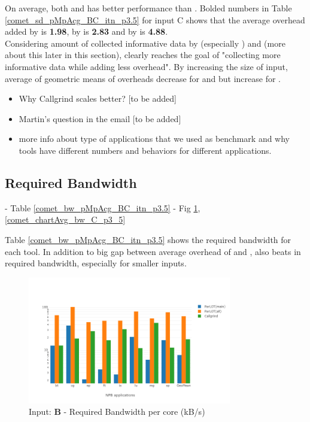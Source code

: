  
 
On average, both \parlotm and \parlota has better performance than \callgrind. Bolded numbers in Table \ref{comet_sd_pMpAcg_BC_itn_p3.5} for input C shows that the average overhead added by \parlotm is \textbf{1.98}, by \parlota is \textbf{2.83} and by \callgrind is \textbf{4.88}. 
\\
Considering amount of collected informative data by \parlot (especially \parlota) and \callgrind (more about this later in this section), clearly \parlot reaches the goal of "collecting more informative data while adding less overhead".
By increasing the size of input, average of geometric means of overheads decrease for \parlotm and \parlota but increase for \callgrind. 

\begin{itemize}
\item Why Callgrind scales better? [to be added]
\item Martin's question in the email [to be added]
\item more info about type of applications that we used as benchmark and why tools have different numbers and behaviors for different applications.
\end{itemize}





  
\subsection{Required Bandwidth}
\label{subsec:lowbw}
 - Table \ref{comet_bw_pMpAcg_BC_itn_p3.5}
  - Fig \ref{comet_chartAvg_bw_B_p3_5}, \ref{comet_chartAvg_bw_C_p3_5}




Table \ref{comet_bw_pMpAcg_BC_itn_p3.5} shows the required bandwidth for each tool. 
In addition to big gap between average overhead of \parlotm and \callgrind, \parlotm also beats \callgrind in required bandwidth, especially for smaller inputs.

\begin{figure}[!t]
\centering
\includegraphics[width=3.5in]{figs.comet.newMed/comet_chartAvg_bw_B_p3_5.png}
\caption{ Input: \textbf{B} - Required Bandwidth per core (kB/s)
}
\label{comet_chartAvg_bw_B_p3_5}
\end{figure}



